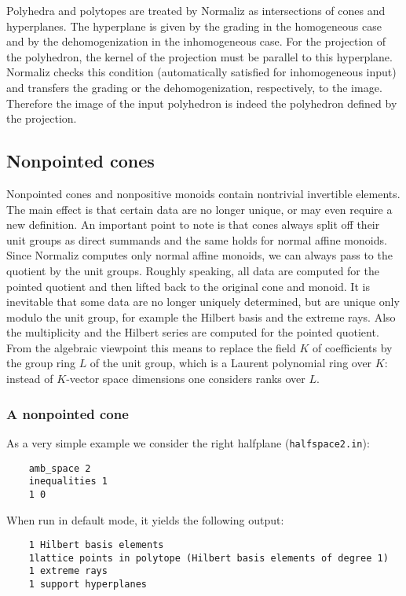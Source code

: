 \documentclass[12pt,a4paper]{scrartcl}
\theoremstyle{definition}
\begin{document}
{	Polyhedra and polytopes are treated by Normaliz as intersections of cones and hyperplanes. The hyperplane is given by the grading in the homogeneous case and by the dehomogenization in the inhomogeneous case. For the projection of the polyhedron, the kernel of the projection must be parallel to this hyperplane. Normaliz checks this condition (automatically satisfied for inhomogeneous input) and transfers the grading or the dehomogenization, respectively, to the image. Therefore the image of the input polyhedron is indeed the polyhedron defined by the projection.
	
	\subsection{Nonpointed cones}\label{Nonpointed}
	
	Nonpointed cones and nonpositive monoids contain nontrivial invertible elements. The main effect is that certain data are no longer unique, or may even require a new definition. An important point to note is that cones always split off their unit groups as direct summands and the same holds for normal affine monoids. Since Normaliz computes only normal affine monoids, we can always pass to the quotient by the unit groups. Roughly speaking, all data are computed for the pointed quotient and then lifted back to the original cone and monoid. It is inevitable that some data are no longer uniquely determined, but are unique only modulo the unit group, for example the Hilbert basis and the extreme rays. Also the multiplicity and the Hilbert series are computed for the pointed quotient. From the algebraic viewpoint this means to replace the field $K$ of coefficients by the group ring $L$ of the unit group, which is a Laurent polynomial ring over $K$: instead of $K$-vector space dimensions one considers ranks over $L$.
	
	\subsubsection{A nonpointed cone}
	
	As a very simple example we consider the right halfplane (\verb|halfspace2.in|):
	\begin{Verbatim}
	amb_space 2
	inequalities 1 
	1 0
	\end{Verbatim}
	When run in default mode, it yields the following output:
	\begin{Verbatim}
	1 Hilbert basis elements
	1lattice points in polytope (Hilbert basis elements of degree 1)
	1 extreme rays
	1 support hyperplanes
	

\end{Verbatim}}
\end{document}
